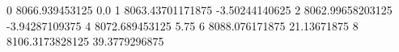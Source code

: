 0 8066.939453125 0.0
1 8063.43701171875 -3.50244140625
2 8062.99658203125 -3.94287109375
4 8072.689453125 5.75
6 8088.076171875 21.13671875
8 8106.3173828125 39.3779296875
